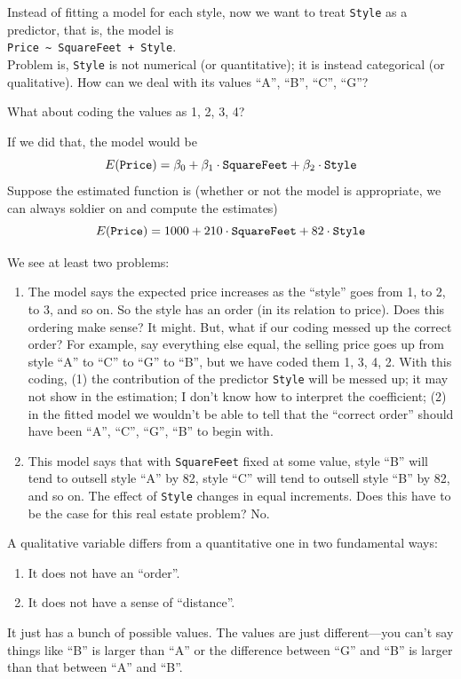 \documentclass[12pt]{article}
\begin{document}
Instead of fitting a model for each style,
now we want to treat \verb+Style+ as a predictor, that is,
the model is\\
\verb&Price ~ SquareFeet + Style&.
\\
Problem is, \verb+Style+ is not numerical (or quantitative);
it is instead categorical (or qualitative).
How can we deal with its values
``A'', ``B'', ``C'', ``G''?

What about coding the values as 1, 2, 3, 4?

If we did that, the model would be
\[
E(\text{\tt Price})
= \beta_0
    + \beta_1 \cdot\text{\tt SquareFeet}
    + \beta_2 \cdot\text{\tt Style}
\]
Suppose the estimated function is
(whether or not the model is appropriate,
we can always soldier on and compute the estimates)
\[
E(\text{\tt Price})
= 1000
    + 210 \cdot\text{\tt SquareFeet}
    + 82 \cdot\text{\tt Style}
\]

We see at least two problems:
\begin{enumerate}
\item The model says the expected price increases
as the ``style'' goes from 1, to 2, to 3, and so on.
So the style has an order (in its relation to price).
Does this ordering make sense?
It might. But, what if our coding messed up the correct order?
For example, say everything else equal, the selling price goes up
from style ``A'' to ``C'' to ``G'' to ``B'',
but we have coded them 1, 3, 4, 2.
With this coding, (1) the contribution of the predictor
\verb+Style+ will be messed up; it may not show in the estimation;
I don't know how to interpret the coefficient;
(2) in the fitted model we wouldn't be
able to tell that the ``correct order'' should have been ``A'', ``C'', ``G'',
``B'' to begin with.

\item This model says that with \verb+SquareFeet+ fixed at some value,
style ``B'' will tend to outsell style ``A'' by 82,
style ``C'' will tend to outsell style ``B'' by 82, and so on.
The effect of \verb+Style+ changes in equal increments.
Does this have to be the case for this real estate problem?
No.
\end{enumerate}


A qualitative variable differs from a quantitative one in two
fundamental ways:
\begin{enumerate}
\item It does not have an ``order''.
\item It does not have a sense of ``distance''.
\end{enumerate}
It just has a bunch of possible values.
The values are just different---you can't say things like
``B'' is larger than ``A'' or the difference between ``G'' and ``B'' is
larger than that between ``A'' and ``B''.
\end{document}
